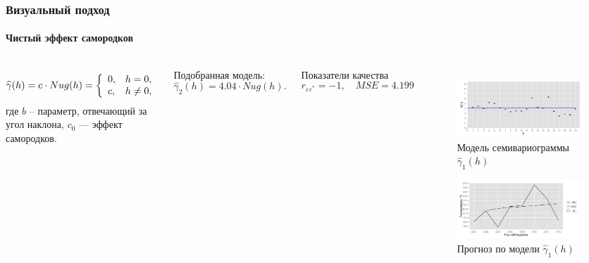 \documentclass[10pt,pdf,aspectratio=169,hyperref={unicode}]{beamer}
\begin{document}
\begin{frame}
  \frametitle{Визуальный подход}
  \framesubtitle{Чистый эффект самородков}
  \begin{columns}[c]
  \column{3in}
  \begin{equation}\begin{gathered}
  \label{eq:nug}
    \widehat{\gamma}(h) = c \cdot Nug(h) = \left\{
   \begin{array}{l l}
     0, & h = 0, \\
     c, & h \neq 0,
   \end{array} \right.
  \end{gathered}\end{equation}
  где $ b $ -- параметр, отвечающий за угол наклона, $ c_0 $ --- эффект самородков.

  \vspace{0.5em}

  Подобранная модель:
  \begin{equation}
  \label{eq:gamma2}
    \widehat{\gamma}_2(h) = 4.04 \cdot Nug(h).
  \end{equation}

  Показатели качества
  \begin{equation*}
    r_{\varepsilon\varepsilon^{*}} = -1, \quad MSE = 4.199
  \end{equation*}

  \column{3in}
  \vspace{-14.5pt}
  \begin{figure}[H]
    \includegraphics[width=0.9\linewidth]{../../figures/variogram/lin-fit-modeled.png} \\
    \caption{Модель семивариограммы $\widehat{\gamma}_1(h)$}
    \includegraphics[width=0.9\linewidth]{../../figures/variogram/lin-fit-cross-prediction.png}
    \caption{Прогноз по модели $\widehat{\gamma}_1(h)$}
  \end{figure}
  \end{columns}
\end{frame}
\end{document}
